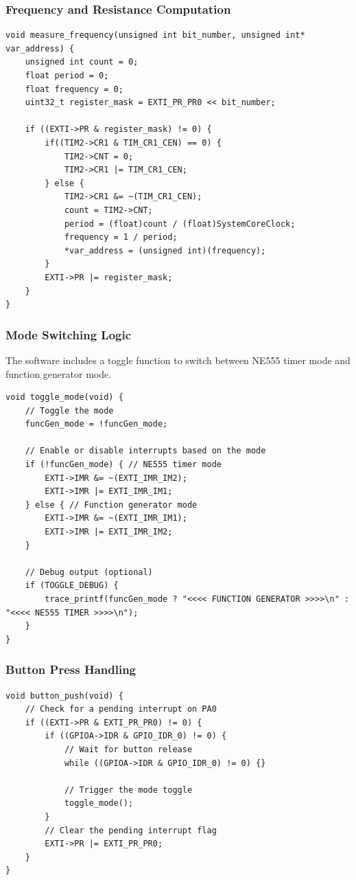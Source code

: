 \subsubsection{Frequency and Resistance Computation}
\begin{lstlisting}[caption=Frequency and Resistance Computation]
void measure_frequency(unsigned int bit_number, unsigned int* var_address) {
    unsigned int count = 0;
    float period = 0;
    float frequency = 0;
    uint32_t register_mask = EXTI_PR_PR0 << bit_number;

    if ((EXTI->PR & register_mask) != 0) {
        if((TIM2->CR1 & TIM_CR1_CEN) == 0) {
            TIM2->CNT = 0;
            TIM2->CR1 |= TIM_CR1_CEN;
        } else {
            TIM2->CR1 &= ~(TIM_CR1_CEN);
            count = TIM2->CNT;
            period = (float)count / (float)SystemCoreClock;
            frequency = 1 / period;
            *var_address = (unsigned int)(frequency);
        }
        EXTI->PR |= register_mask;
    }
}
\end{lstlisting}

\subsubsection{Mode Switching Logic}
The software includes a toggle function to switch between NE555 timer mode and function generator mode.

\begin{lstlisting}[caption=Toggle Mode Function]
void toggle_mode(void) {
    // Toggle the mode
    funcGen_mode = !funcGen_mode;

    // Enable or disable interrupts based on the mode
    if (!funcGen_mode) { // NE555 timer mode
        EXTI->IMR &= ~(EXTI_IMR_IM2);
        EXTI->IMR |= EXTI_IMR_IM1;
    } else { // Function generator mode
        EXTI->IMR &= ~(EXTI_IMR_IM1);
        EXTI->IMR |= EXTI_IMR_IM2;
    }

    // Debug output (optional)
    if (TOGGLE_DEBUG) {
        trace_printf(funcGen_mode ? "<<<< FUNCTION GENERATOR >>>>\n" : "<<<< NE555 TIMER >>>>\n");
    }
}
\end{lstlisting}

\subsubsection{Button Press Handling}
\begin{lstlisting}[caption=Button Push Handler Function]
void button_push(void) {
    // Check for a pending interrupt on PA0
    if ((EXTI->PR & EXTI_PR_PR0) != 0) {
        if ((GPIOA->IDR & GPIO_IDR_0) != 0) {
            // Wait for button release
            while ((GPIOA->IDR & GPIO_IDR_0) != 0) {}
            
            // Trigger the mode toggle
            toggle_mode();
        }
        // Clear the pending interrupt flag
        EXTI->PR |= EXTI_PR_PR0;
    }
}
\end{lstlisting}

